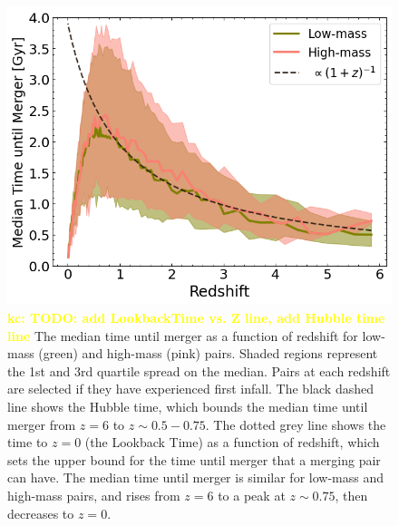 \documentclass[twocolumn,linenumbers]{aastex631}
\newcommand{\kc}[1]{\textcolor{yellow}{\textbf{kc: #1}} }
\begin{document}



\begin{figure}[htb]
    \centering
    \includegraphics[width=\textwidth]{plots/bet-on-it/3_time_til_merger_full_fit.png}
    \caption{\kc{TODO: add LookbackTime vs. Z line, add Hubble time line} The median time until merger as a function of redshift for low-mass (green) and high-mass (pink) pairs. Shaded regions represent the 1st and 3rd quartile spread on the median. Pairs at each redshift are selected if they have experienced first infall. 
    The black dashed line shows the Hubble time, which bounds the median time until merger from $z=6$ to $z\sim0.5-0.75$.
    The dotted grey line shows the time to $z=0$ (the Lookback Time) as a function of redshift, which sets the upper bound for the time until merger that a merging pair can have. 
    The median time until merger is similar for low-mass and high-mass pairs, and rises from $z=6$ to a peak at $z\sim0.75$, then decreases to $z=0$.}
    \label{fig:timescales}
\end{figure}
\end{document}
